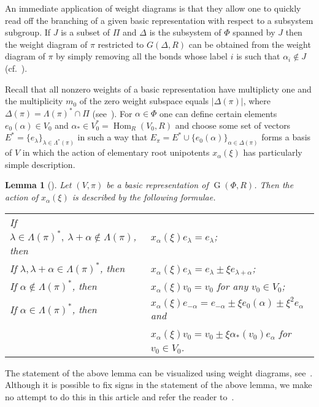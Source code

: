 \documentclass[12pt]{amsart}
\theoremstyle{plain}
\numberwithin{equation}{section}
\newtheorem{lemma}{Lemma}
\numberwithin{lemma}{section}
\theoremstyle{definition}
\theoremstyle{remark}
\DeclareMathOperator{\G}{G}
\DeclareMathOperator{\Hom}{Hom}
\begin{document}
An immediate application of weight diagrams is that they allow one to quickly read off the branching of a given basic representation with respect to a subsystem subgroup.
If $J$ is a subset of $\Pi$ and $\Delta$ is the subsystem of $\Phi$ spanned by $J$ then the weight diagram of $\pi$ restricted to $G(\Delta, R)$ can be obtained
from the weight diagram of $\pi$ by simply removing all the bonds whose label $i$ is such that $\alpha_i\not\in J$ (cf.~\cite[\S~2.7]{PSV98}).
 
Recall that all nonzero weights of a basic representation have multiplicty one and the multiplicity $m_0$ of the zero weight subspace equals $|\Delta(\pi)|$, where $\Delta(\pi)= \Lambda(\pi)^* \cap \Pi$ (see~\cite[Lemma~2.1]{Ma69}).
For $\alpha \in \Phi$ one can define certain elements $e_0(\alpha) \in V_0$ and $\alpha_* \in V_0^* = \Hom_R(V_0, R)$
and choose some set of vectors $E^* = \{ e_\lambda \}_{\lambda \in \Lambda^*(\pi)}$ in such a way that 
$E_\pi = E^* \cup \{ e_0(\alpha) \}_{\alpha \in \Delta(\pi)}$ forms a basis of $V$ in which the action of elementary root unipotents
$x_\alpha(\xi)$ has particularly simple description.

\begin{lemma}[{\cite[Lemma~2.3]{Ma69}}]\label{lemma:Matsumoto}
Let $(V, \pi)$ be a basic representation of $\G(\Phi, R)$.
Then the action of $x_\alpha(\xi)$ is described by the following formulae.
\newline \begin{tabular}{ll}
If $\lambda\in\Lambda(\pi)^*, \ \lambda+\alpha\notin\Lambda(\pi)$, then & $x_\alpha(\xi)e_\lambda=e_\lambda$; \\
If $\lambda, \lambda+\alpha\in\Lambda(\pi)^*$, then & $x_\alpha(\xi)e_\lambda=e_\lambda\pm\xi e_{\lambda+\alpha}$; \\
If $\alpha\notin\Lambda(\pi)^*$, then & $x_\alpha(\xi)v_0=v_0$ for any $v_0\in V_0$; \\
If $\alpha\in\Lambda(\pi)^*$, then & $x_\alpha(\xi)e_{-\alpha} = e_{-\alpha}\pm\xi e_0(\alpha)\pm\xi^2 e_\alpha$ and \\
                                   & $x_\alpha(\xi)v_0         = v_0\pm\xi\alpha_*(v_0)e_\alpha$ for $v_0 \in V_0$.
\end{tabular} \end{lemma}
The statement of the above lemma can be visualized using weight diagrams, see~\cite[\S~3.4]{PSV98}.
Although it is possible to fix signs in the statement of the above lemma, we make no attempt to do this in this article and refer the reader to~\cite{V08}.
\end{document}
